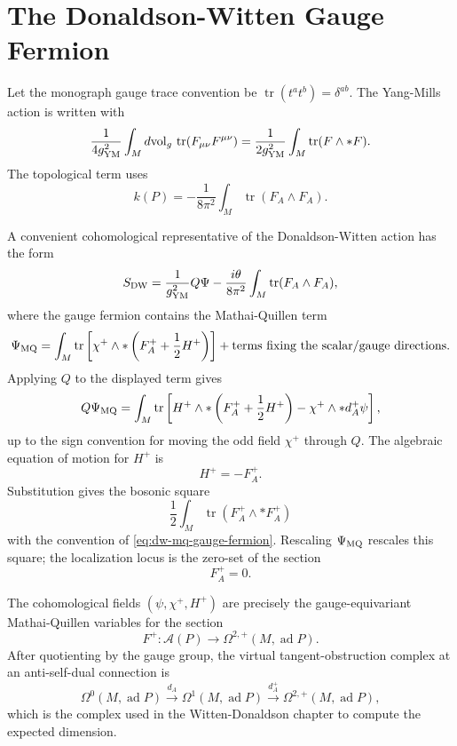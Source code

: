 \section{The Donaldson-Witten Gauge Fermion}

Let the monograph gauge trace convention be
\(\operatorname{tr}(t^at^b)=\delta^{ab}\).  The Yang-Mills action is written
with
\[
  \frac{1}{4g_{\rm YM}^2}
  \int_M d{\rm vol}_g\,\operatorname{tr}(F_{\mu\nu}F^{\mu\nu})
  =
  \frac{1}{2g_{\rm YM}^2}
  \int_M\operatorname{tr}(F\wedge *F).
\]
The topological term uses
\[
  k(P)=-\frac{1}{8\pi^2}\int_M\operatorname{tr}(F_A\wedge F_A).
\]

A convenient cohomological representative of the Donaldson-Witten action has
the form
\begin{equation}
  S_{\rm DW}
  =
  \frac{1}{g_{\rm YM}^2}Q\Psi
  -\frac{i\theta}{8\pi^2}\int_M\operatorname{tr}(F_A\wedge F_A),
  \label{eq:donaldson-witten-action-q-exact}
\end{equation}
where the gauge fermion contains the Mathai-Quillen term
\begin{equation}
  \Psi_{\rm MQ}
  =
  \int_M
  \operatorname{tr}\left[
  \chi^+\wedge *
  \left(F_A^+ +\frac12 H^+\right)
  \right]
  +\text{terms fixing the scalar/gauge directions}.
  \label{eq:dw-mq-gauge-fermion}
\end{equation}
Applying \(Q\) to the displayed term gives
\[
  Q\Psi_{\rm MQ}
  =
  \int_M\operatorname{tr}\left[
  H^+\wedge *\left(F_A^++\frac12H^+\right)
  -
  \chi^+\wedge *d_A^+\psi
  \right],
\]
up to the sign convention for moving the odd field \(\chi^+\) through \(Q\).
The algebraic equation of motion for \(H^+\) is
\[
  H^+=-F_A^+ .
\]
Substitution gives the bosonic square
\[
  \frac12\int_M\operatorname{tr}(F_A^+\wedge *F_A^+)
\]
with the convention of \eqref{eq:dw-mq-gauge-fermion}.  Rescaling
\(\Psi_{\rm MQ}\) rescales this square; the localization locus is the
zero-set of the section
\[
  F_A^+=0.
\]

The cohomological fields \((\psi,\chi^+,H^+)\) are precisely the
gauge-equivariant Mathai-Quillen variables for the section
\[
  F^+:\mathcal A(P)\longrightarrow
  \Omega^{2,+}(M,\operatorname{ad}P).
\]
After quotienting by the gauge group, the virtual tangent-obstruction
complex at an anti-self-dual connection is
\[
  \Omega^0(M,\operatorname{ad}P)
  \xrightarrow{d_A}
  \Omega^1(M,\operatorname{ad}P)
  \xrightarrow{d_A^+}
  \Omega^{2,+}(M,\operatorname{ad}P),
\]
which is the complex used in the Witten-Donaldson chapter to compute the
expected dimension.

